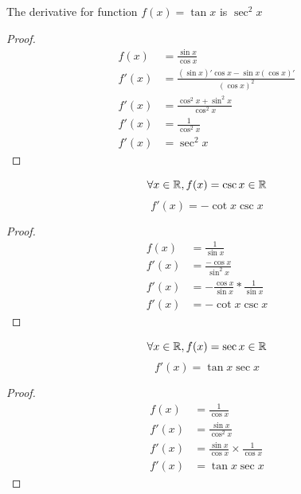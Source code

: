 \begin{proposition}
    The derivative for function $f(x) = \tan x$ is $\sec^2 x$
    \begin{proof}
        \begin{align*}
            f(x) &= \frac{
                \sin x
            }{
                \cos x
            } \\
            f'(x) &= \frac{
                (\sin x)'\cos x - \sin x (\cos x)'
            }{
                (\cos x)^2
            } \\
            f'(x) &= \frac{
                \cos^2 x + \sin^2 x
            }{
                \cos^2 x
            }\\
            f'(x) &= \frac{
                1
            }{\cos^2 x}\\
            f'(x) &= \sec^2 x
        \end{align*}
    \end{proof}
\end{proposition}

\begin{proposition}
    $$\forall x \in \mathbb{R}, f(x) = \csc x \in \mathbb{R}$$
    $$f'(x) = -\cot x \csc x$$
    \begin{proof}
        \begin{align*}
            f(x) &= \frac{
                1
            }{
                \sin x
            } \\
            f'(x) &= \frac{
                -\cos x
            }{
                \sin^2 x
            } \\
            f'(x) &= -\frac{
                \cos x
            }{\sin x} * \frac{1}{\sin x}\\
            f'(x) &= -\cot x \csc x
        \end{align*}
    \end{proof}
\end{proposition}

\begin{proposition}
    $$\forall x \in \mathbb{R}, f(x) = \sec x \in \mathbb{R}$$
    $$f'(x) = \tan x \sec x$$
    \begin{proof}
        \begin{align*}
            f(x) &= \frac{1}{\cos x} \\
            f'(x) &= \frac{\sin x}{\cos^2 x}\\
            f'(x) &= \frac{\sin x}{\cos x} \times \frac{1}{\cos x}\\
            f'(x) &= \tan x \sec x
        \end{align*}
    \end{proof}
\end{proposition}

